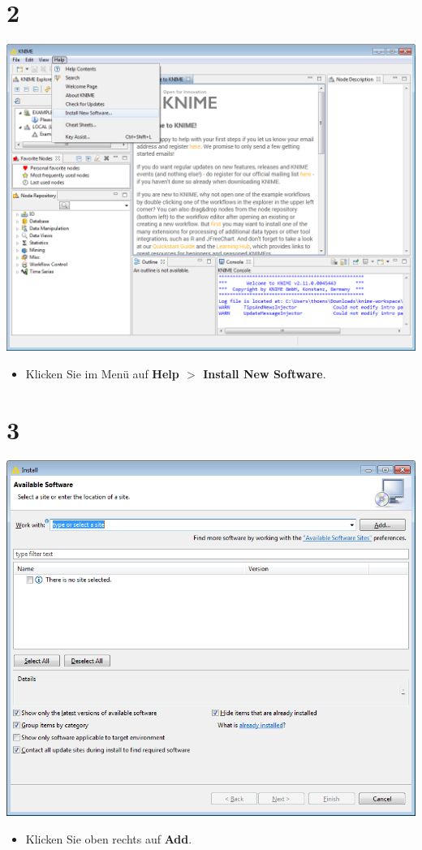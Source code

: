 \documentclass{beamer}
\begin{document}
\section{2}
\begin{frame}
	\begin{center}
  		\includegraphics[height=0.7\textheight]{2.png}
	\end{center}
	\begin{itemize}
		\item Klicken Sie im Menü auf \textbf{Help $>$ Install New Software}.
	\end{itemize}
\end{frame}

\section{3}
\begin{frame}
	\begin{center}
  		\includegraphics[height=0.7\textheight]{3.png}
	\end{center}
	\begin{itemize}
		\item Klicken Sie oben rechts auf \textbf{Add}.
	\end{itemize}
\end{frame}
\end{document}
